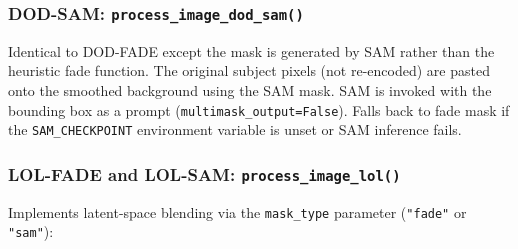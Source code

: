 \documentclass[11pt,a4paper]{article}
\begin{document}
\subsubsection{DOD-SAM: \texttt{process\_image\_dod\_sam()}}

Identical to DOD-FADE except the mask is generated by SAM rather than the heuristic fade function. The original subject pixels (not re-encoded) are pasted onto the smoothed background using the SAM mask. SAM is invoked with the bounding box as a prompt (\texttt{multimask\_output=False}). Falls back to fade mask if the \texttt{SAM\_CHECKPOINT} environment variable is unset or SAM inference fails.

\subsubsection{LOL-FADE and LOL-SAM: \texttt{process\_image\_lol()}}

Implements latent-space blending via the \texttt{mask\_type} parameter (\texttt{"fade"} or \texttt{"sam"}):
\end{document}
